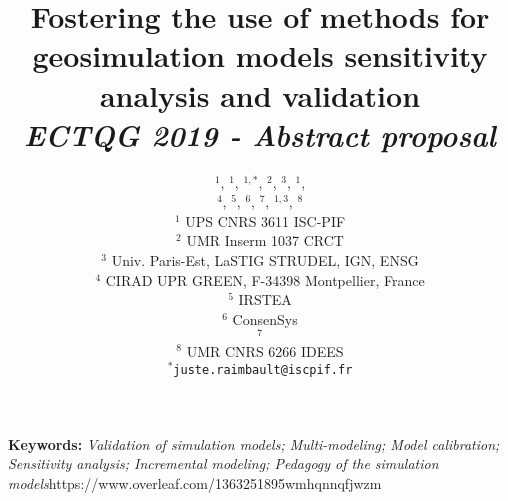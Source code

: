\documentclass[11pt]{article}
\begin{document}
\title{\vspace{-1cm}Fostering the use of methods for geosimulation models sensitivity analysis and validation
\\\medskip
\textit{ECTQG 2019 - Abstract proposal}
}
\author{$^{1}$, $^{1}$, $^{1,\ast}$, $^2$, $^3$, $^1$,\\
 $^4$, $^5$, $^6$, $^7$, $^{1,3}$, $^8$\medskip\\
$^1$ UPS CNRS 3611 ISC-PIF\\
$^2$ UMR Inserm 1037 CRCT\\
$^3$ Univ. Paris-Est, LaSTIG STRUDEL, IGN, ENSG\\
$^4$ CIRAD UPR GREEN, F-34398 Montpellier, France\\
$^5$ IRSTEA \\
$^6$ ConsenSys\\
$^7$ \\
$^8$ UMR CNRS 6266 IDEES
\medskip\\
$^{\ast}$\texttt{juste.raimbault@iscpif.fr}
}
\date{}

\maketitle

\justify



\textbf{Keywords: }\textit{Validation of simulation models; Multi-modeling; Model calibration; Sensitivity analysis; Incremental modeling; Pedagogy of the simulation models}https://www.overleaf.com/1363251895wmhqnnqfjwzm

\medskip
\end{document}
